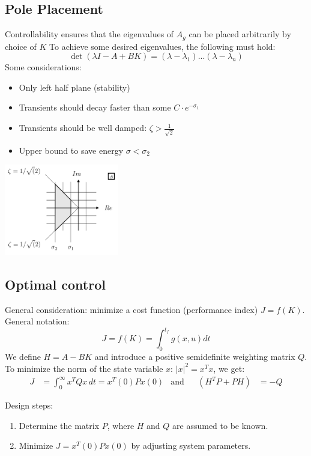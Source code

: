 \subsection{Pole Placement}
\begin{minipage}{10cm}
Controllability ensures that the eigenvalues of $A_g$ can be placed arbitrarily by choice of $K$
To achieve some desired eigenvalues, the following must hold:
\[
    \det(\lambda I-A+BK) = (\lambda - \lambda_1)...(\lambda - \lambda_n)
\]
Some considerations:
\begin{itemize}
    \item Only left half plane (stability)
    \item Transients should decay faster than some $C \cdot e^{-\sigma_1}$
    \item Transients should be well damped: $\zeta > \frac{1}{\sqrt{2}}$
    \item Upper bound to save energy $\sigma < \sigma_2$
\end{itemize}

\end{minipage}
\hspace{0.5cm}
\begin{minipage}{8cm}
    \centering
    \includegraphics[width=5cm]{./bilder/pole_locations.png}
\end{minipage}

\subsection{Optimal control}
General consideration: minimize a cost function (performance index) $J = f(K)$.
General notation:
\[
    J = f(K) = \int_{0}^{t_f} g(x,u) dt
\]
We define $H = A - BK$ and introduce a positive semidefinite weighting matrix $Q$.
To minimize the norm of the state variable $x$: $|x|^2 = x^Tx$, we get:
\begin{align*}
    J &= \int_0^{\infty} x^T Q x \, dt = x^T(0) P x(0) & \text{and} && (H^TP + PH) &= -Q
\end{align*}

Design steps:
\begin{enumerate}
    \item Determine the matrix $P$, where $H$ and $Q$ are assumed to be known.
    \item Minimize $J = x^T(0) P x(0)$ by adjusting system parameters.
\end{enumerate}

